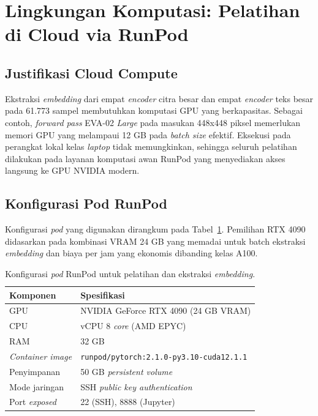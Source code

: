 \section{Lingkungan Komputasi: Pelatihan di Cloud via RunPod}
\label{sec:runpod}

\subsection{Justifikasi Cloud Compute}

Ekstraksi \textit{embedding} dari empat \textit{encoder} citra besar dan empat \textit{encoder} teks besar pada 61.773 sampel membutuhkan komputasi GPU yang berkapasitas. Sebagai contoh, \textit{forward pass} EVA-02 \textit{Large} pada masukan 448x448 piksel memerlukan memori GPU yang melampaui 12 GB pada \textit{batch size} efektif. Eksekusi pada perangkat lokal kelas \textit{laptop} tidak memungkinkan, sehingga seluruh pelatihan dilakukan pada layanan komputasi awan RunPod yang menyediakan akses langsung ke GPU NVIDIA modern.

\subsection{Konfigurasi Pod RunPod}

Konfigurasi \textit{pod} yang digunakan dirangkum pada Tabel~\ref{tab:runpod}. Pemilihan RTX 4090 didasarkan pada kombinasi VRAM 24 GB yang memadai untuk batch ekstraksi \textit{embedding} dan biaya per jam yang ekonomis dibanding kelas A100.

\begin{table}[htbp]
\centering
\caption{Konfigurasi \textit{pod} RunPod untuk pelatihan dan ekstraksi \textit{embedding}.}
\label{tab:runpod}
\begin{tabular}{p{4.5cm} p{8cm}}
\toprule
\textbf{Komponen} & \textbf{Spesifikasi} \\
\midrule
GPU & NVIDIA GeForce RTX 4090 (24 GB VRAM) \\
CPU & vCPU 8 \textit{core} (AMD EPYC) \\
RAM & 32 GB \\
\textit{Container image} & \texttt{runpod/\allowbreak{}pytorch:\allowbreak{}2.1.0-\allowbreak{}py3.10-\allowbreak{}cuda12.1.1} \\
Penyimpanan & 50 GB \textit{persistent volume} \\
Mode jaringan & SSH \textit{public key authentication} \\
Port \textit{exposed} & 22 (SSH), 8888 (Jupyter) \\
\bottomrule
\end{tabular}
\end{table}

